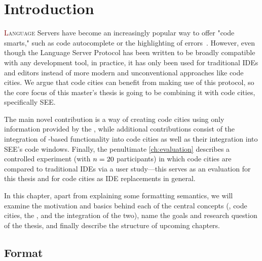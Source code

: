\documentclass[../thesis]{subfiles}
\begin{document}
\chapter{Introduction}\label{ch:intro}
\lettrine[lines=3]{\textcolor{Maroon}{L}}{anguage} Servers have become an increasingly popular way to offer "code smarts," such as code autocomplete or the highlighting of errors~\cite{lsp,gunasinghe2022}.
However, even though the Language Server Protocol has been written to be broadly compatible with any development tool, in practice, it has only been used for traditional IDEs and editors instead of more modern and unconventional approaches like code cities.
We argue that code cities can benefit from making use of this protocol, so the core focus of this master's thesis is going to be combining it with code cities, specifically SEE.

The main novel contribution is a way of creating code cities using only information provided by the , while additional contributions consist of the integration of -based functionality into code cities as well as their integration into SEE's code windows.
Finally, the penultimate \cref{ch:evaluation} describes a controlled experiment (with $n=20$ participants) in which code cities are compared to traditional IDEs via a user study---this serves as an evaluation for this thesis and for code cities as IDE replacements in general.

In this chapter, apart from explaining some formatting semantics, we will examine the motivation and basics behind each of the central concepts (\ie, code cities, the , and the integration of the two), name the goals and research question of the thesis, and finally describe the structure of upcoming chapters.

\section{Format}
\end{document}
